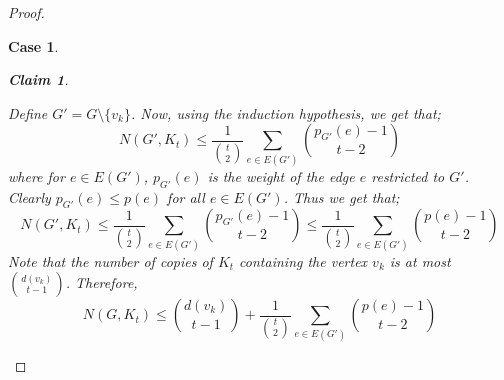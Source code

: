 \documentclass[pdflatex,sn-basic,Numbered]{sn-jnl}
\newtheorem{cl}{Claim}
\newtheorem{case}{Case}
\begin{document}
\begin{proof}
\begin{case}
\begin{cl}
    \end{cl}
   \noindent Define $G' = G\setminus \{v_k\}$. Now, using the induction hypothesis, we get that;
    \begin{equation*}
        N(G',K_t) \leq   \frac{1}{{t\choose 2}}\sum_{e \in E(G')}{p_{G'}(e)-1\choose t-2}
    \end{equation*}
    where for $e \in E(G')$, $p_{G'}(e)$ is the weight of the edge $e$ restricted to $G'$. Clearly $p_{G'}(e) \leq p(e)$ for all $e \in E(G')$. Thus we get that;
    \begin{equation*}
        N(G',K_t) \leq   \frac{1}{{t\choose 2}}\sum_{e \in E(G')}{p_{G'}(e)-1\choose t-2} \leq \frac{1}{{t\choose 2}}\sum_{e \in E(G')}{p(e)-1\choose t-2}
    \end{equation*}
    Note that the number of copies of $K_t$ containing the vertex $v_k$ is at most ${d(v_k)\choose t-1}$. Therefore,
    \begin{equation}\label{eqn15}
        N(G,K_t) \leq {d(v_k)\choose t-1} +\frac{1}{{t\choose 2}}\sum_{e \in E(G')}{p(e)-1\choose t-2}
    \end{equation}


\end{case}
\end{proof}
\end{document}

